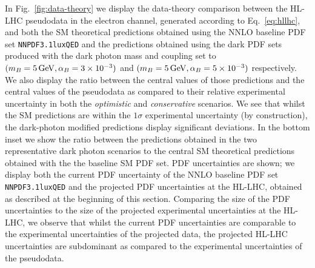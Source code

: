 \documentclass[withindex,glossary]{cam-thesis}
\begin{document}
%
In Fig.~\ref{fig:data-theory} we display the data-theory comparison
between the HL-LHC pseudodata in the electron channel, generated according to
Eq.~\eqref{eq:hllhc}, and both the SM theoretical predictions obtained using
  the NNLO baseline PDF set {\tt NNPDF3.1luxQED} and the predictions
  obtained using the dark PDF sets produced with the dark photon mass
  and coupling set
  to $(m_B=5\,{\rm GeV},\alpha_B=3\times 10^{-3})$ 
  and $(m_B=5\,{\rm GeV},\alpha_B=5\times 10^{-3})$ respectively. We also display 
 the ratio between the central values of those predictions and the
 central values of the pseudodata as compared to their relative
 experimental uncertainty in both the
 {\it optimistic} and {\it conservative} scenarios.
We see that whilst the SM predictions are within the $1\sigma$
experimental uncertainty (by construction), the dark-photon modified
predictions display significant deviations. 
In the bottom inset we show the ratio between the predictions
obtained in the two representative dark photon scenarios to the
central SM theoretical predictions obtained with the
the baseline SM PDF set. PDF uncertainties are shown; we display
both the current PDF uncertainty of the NNLO baseline PDF set {\tt
  NNPDF3.1luxQED} and the projected PDF uncertainties 
  at the HL-LHC, obtained as described at the beginning of this
  section. Comparing the size of the PDF uncertainties to the size of the
  projected experimental uncertainties at the HL-LHC, we observe
  that whilst the current PDF uncertainties are comparable to the
  experimental uncertainties of the projected data, the projected
  HL-LHC uncertainties are subdominant as compared to the
  experimental uncertainties of the pseudodata.
\end{document}
